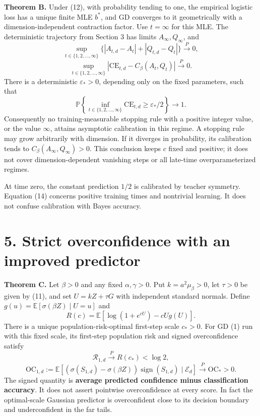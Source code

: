 \documentclass[
  11pt,
  a4paper,
]{article}
\begin{document}
\textbf{Theorem B.} Under (12), with probability tending to one, the
empirical logistic loss has a unique finite MLE \(b^*\), and GD
converges to it geometrically with a dimension-independent contraction
factor. Use \(t=\infty\) for this MLE. The deterministic trajectory from
Section 3 has limits \(A_\infty,Q_\infty\), and \[
\sup_{t\in\{1,2,\ldots,\infty\}}
\{|A_{t,d}-A_t|+|Q_{t,d}-Q_t|\}\xrightarrow{P}0,
\] \[
\sup_{t\in\{1,2,\ldots,\infty\}}
|\mathrm{CE}_{t,d}-C_\beta(A_t,Q_t)|\xrightarrow{P}0. \tag{13}
\] There is a deterministic \(\varepsilon_*>0\), depending only on the
fixed parameters, such that \[
\mathbb P\left\{\inf_{t\in\{1,2,\ldots,\infty\}}\mathrm{CE}_{t,d}\ge\varepsilon_*/2\right\}\longrightarrow1. \tag{14}
\] Consequently no training-measurable stopping rule with a positive
integer value, or the value \(\infty\), attains asymptotic calibration
in this regime. A stopping rule may grow arbitrarily with dimension. If
it diverges in probability, its calibration tends to
\(C_\beta(A_\infty,Q_\infty)>0\). This conclusion keeps \(c\) fixed and
positive; it does not cover dimension-dependent vanishing steps or all
late-time overparameterized regimes.

At time zero, the constant prediction \(1/2\) is calibrated by teacher
symmetry. Equation (14) concerns positive training times and nontrivial
learning. It does not confuse calibration with Bayes accuracy.

\hypertarget{strict-overconfidence-with-an-improved-predictor}{%
\section{5. Strict overconfidence with an improved
predictor}\label{strict-overconfidence-with-an-improved-predictor}}

\textbf{Theorem C.} Let \(\beta>0\) and any fixed \(\alpha,\gamma>0\).
Put \(k=a^2\mu_\beta>0\), let \(\tau>0\) be given by (11), and set
\(U=kZ+\tau G\) with independent standard normals. Define
\(g(u)=\mathbb E[\sigma(\beta Z)\mid U=u]\) and \[
R(c)=\mathbb E[\log(1+e^{cU})-cU g(U)].
\] There is a unique population-risk-optimal first-step scale \(c_*>0\).
For GD (1) run with this fixed scale, its first-step population risk and
signed overconfidence satisfy \[
\mathcal R_{1,d}\xrightarrow{P}R(c_*)<\log2,
\] \[
\mathrm{OC}_{1,d}:=
\mathbb E[(\sigma(S_{1,d})-\sigma(\beta Z))\operatorname{sign}(S_{1,d})\mid\mathcal E_d]
\xrightarrow{P}\mathrm{OC}_*>0. \tag{15}
\] The signed quantity is \textbf{average predicted confidence minus
classification accuracy}. It does not assert pointwise overconfidence at
every score. In fact the optimal-scale Gaussian predictor is
overconfident close to its decision boundary and underconfident in the
far tails.
\end{document}

